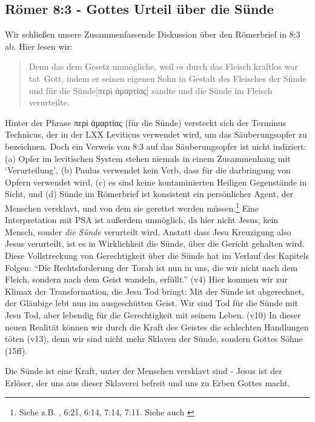 \subsection{Römer 8:3 - Gottes Urteil über die Sünde}
Wir schließen unsere Zusammenfassende Diskussion über den Römerbrief in 8:3 ab.
Hier lesen wir:
\begin{quote}
	Denn das dem Gesetz unmögliche, weil es durch das Fleisch kraftlos war \textlangle tat\textrangle\ Gott, indem er seinen eigenen Sohn in Gestalt
	des Fleisches der Sünde und für die Sünde[περὶ ἁμαρτίας] sandte und die Sünde im Fleisch verurteilte.
\end{quote}
Hinter der Phrase περὶ ἁμαρτίας (für die Sünde) versteckt sich der Terminus Technicus, der in der LXX Leviticus verwendet wird,
um das Säuberungsopfer zu bezeichnen.
Doch ein Verweis von 8:3 auf das Säuberungsopfer ist nicht indiziert:
(a) Opfer im levitischen System stehen niemals in einem Zusammenhang mit `Verurteilung',
(b) Paulus verwendet kein Verb, dass für die darbringung von Opfern verwendet wird,
(c) es sind keine kontaminierten Heiligen Gegenstände in Sicht, und
(d) Sünde im Römerbrief ist konsistent ein persönlicher Agent, der Menschen versklavt, und von dem sie gerettet werden müssen.\footnote{
	Siehe z.B. , 6:21, 6:14, 7:14, 7:11.
	Siehe auch \Cite[S. 257]{lamb-of-the-free}
}
Eine Interpretation mit PSA ist außerdem unmöglich, da hier nicht Jesus, kein Mensch, sonder \textit{die Sünde} verurteilt wird.
Anstatt dass Jesu Kreuzigung also Jesus verurteilt, ist es in Wirklichkeit die Sünde, über die Gericht gehalten wird.
Diese Vollstreckung von Gerechtigkeit über die Sünde hat im Verlauf des Kapitels Folgen:
``Die Rechtsforderung der Torah ist nun in uns, die wir nicht nach dem Fleich, sondern nach dem Geist wandeln, erfüllt.'' (v4)
Hier kommen wir zur Klimax der Transformation, die Jesu Tod bringt: Mit der Sünde ist abgerechnet,
der Gläubige lebt nun im ausgeschütten Geist.
Wir sind Tod für die Sünde mit Jesu Tod, aber lebendig für die Gerechtigkeit mit seinem Leben. (v10)
In dieser neuen Realität können wir durch die Kraft des Geistes die schlechten Handlungen töten (v13),
denn wir sind nicht mehr Sklaven der Sünde, sondern Gottes Söhne (15ff).

Die Sünde ist eine Kraft, unter der Menschen versklavt sind - Jesus ist der Erlöser, der uns aus dieser Sklaverei befreit und uns zu Erben Gottes macht.

